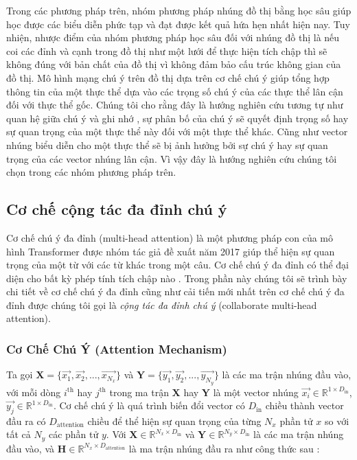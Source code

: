 Trong các phương pháp trên, nhóm phương pháp nhúng đồ thị bằng học sâu giúp học được các biểu diễn phức tạp và đạt được kết quả hứa hẹn nhất hiện nay. Tuy nhiện, nhược điểm của nhóm phương pháp học sâu đối với nhúng đồ thị là nếu coi các đỉnh và cạnh trong đồ thị như một lưới để thực hiện tích chập thì sẽ không đúng với bản chất của đồ thị vì không đảm bảo cấu trúc không gian của đồ thị. Mô hình mạng chú ý trên đồ thị dựa trên cơ chế chú ý giúp tổng hợp thông tin của một thực thể dựa vào các trọng số chú ý của các thực thể lân cận đối với thực thể gốc. Chúng tôi cho rằng đây là hướng nghiên cứu tương tự như quan hệ giữa chú ý và ghi nhớ \cite{memoryandattention:2020}, sự phân bố của chú ý sẽ quyết định trọng số hay sự quan trọng của một thực thể này đối với một thực thể khác. Cũng như vector nhúng biểu diễn cho một thực thể sẽ bị ảnh hưởng bởi sự chú ý hay sự quan trọng của các vector nhúng lân cận. Vì vậy đây là hướng nghiên cứu chúng tôi chọn trong các nhóm phương pháp trên.

%
%

\subsection{Cơ chế cộng tác đa đỉnh chú ý}

Cơ chế chú ý đa đỉnh (multi-head attention) là một phương pháp con của mô hình Transformer \cite{vaswani2017attention} được nhóm tác giả đề xuất năm 2017 giúp thể hiện sự quan trọng của một từ với các từ khác trong một câu. Cơ chế chú ý đa đỉnh có thể đại diện cho bất kỳ phép tính tích chập nào \cite{cordonnier2019relationship}. Trong phần này chúng tôi sẽ trình bày chi tiết về cơ chế chú ý đa đỉnh cũng như cải tiến mới nhất trên cơ chế chú ý đa đỉnh \cite{cordonnier2020multi} được chúng tôi gọi là \textit{cộng tác đa đỉnh chú ý} (collaborate multi-head attention).

\subsubsection{Cơ Chế Chú Ý (Attention Mechanism)}
\label{sec:attentionMechanism}

Ta gọi $\mathbf{X} = \Big\{\overrightarrow{x_1}, \overrightarrow{x_2}, ...,  \overrightarrow{x_{N_x}}\Big\}$ và $\mathbf{Y} = \Big\{\overrightarrow{y_1}, \overrightarrow{y_2}, ...,  \overrightarrow{y_{N_y}}\Big\}$ là các ma trận nhúng đầu vào, với mỗi dòng $i^{\text{th}}$ hay $j^{\text{th}}$ trong ma trận $\mathbf{X}$ hay $\mathbf{Y}$ là một vector nhúng $\overrightarrow{x_i} \in \mathbb{R}^{1 \times D_{\text{in}}}$, $\overrightarrow{y_j} \in \mathbb{R}^{1 \times D_{\text{in}}}$.
Cơ chế chú ý là quá trình biến đổi vector có $D_{\text{in}}$ chiều thành vector đầu ra có $D_{\text{attention}}$ chiều để thể hiện sự quan trọng của từng $N_x$ phần tử $x$ so với tất cả $N_y$ các phần tử $y$. Với $\mathbf{X} \in \mathbb{R}^{N_x \times D_\text{in}}$ và $\mathbf{Y} \in \mathbb{R}^{N_y \times D_\text{in}}$ là các ma trận nhúng đầu vào, và $\mathbf{H} \in \mathbb{R}^{N_x \times D_\text{attention}}$ là ma trận nhúng đầu ra như công thức sau :

